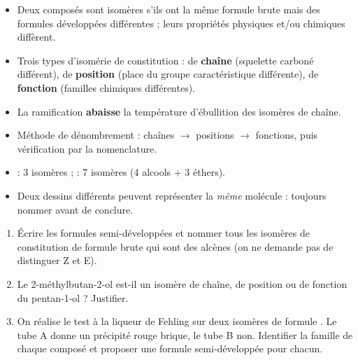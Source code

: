 \documentclass[11pt]{article}
\newcommand{\cle}[1]{{\popxbold\color{popdark}#1}}
\begin{document}
\begin{aretenir}
\begin{itemize}
\item Deux composés sont \cle{isomères} s'ils ont la même formule brute mais des formules développées différentes ; leurs propriétés physiques et/ou chimiques diffèrent.
\item Trois types d'\cle{isomérie de constitution} : de \textbf{chaîne} (squelette carboné différent), de \textbf{position} (place du groupe caractéristique différente), de \textbf{fonction} (familles chimiques différentes).
\item La ramification \textbf{abaisse} la température d'ébullition des isomères de chaîne.
\item Méthode de dénombrement : chaînes $\rightarrow$ positions $\rightarrow$ fonctions, puis vérification par la nomenclature.
\item {} : 3 isomères ;  : 7 isomères (4 alcools + 3 éthers).
\item Deux dessins différents peuvent représenter la \emph{même} molécule : toujours nommer avant de conclure.
\end{itemize}
\end{aretenir}

\begin{exercice}
\begin{enumerate}
\item Écrire les formules semi-développées et nommer tous les isomères de constitution de formule brute  qui sont des alcènes (on ne demande pas de distinguer Z et E).
\item Le 2-méthylbutan-2-ol est-il un isomère de chaîne, de position ou de fonction du pentan-1-ol ? Justifier.
\item On réalise le test à la liqueur de Fehling sur deux isomères de formule . Le tube A donne un précipité rouge brique, le tube B non. Identifier la famille de chaque composé et proposer une formule semi-développée pour chacun.
\end{enumerate}
\end{exercice}
\end{document}
